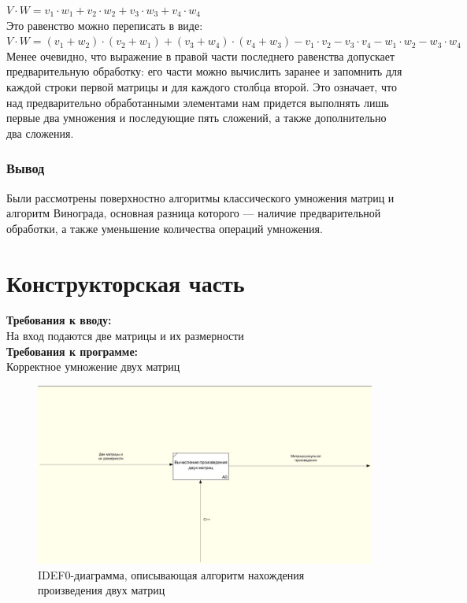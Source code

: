 \documentclass[12pt]{report}
\begin{document}
$ V \cdot W=v_1 \cdot w_1 + v_2 \cdot w_2 + v_3 \cdot w_3 + v_4 \cdot w_4$ \\

Это равенство можно переписать в виде: \\
$V \cdot W=(v_1 + w_2) \cdot (v_2 + w_1) + (v_3 + w_4) \cdot (v_4 + w_3) - v_1 \cdot v_2 - v_3 \cdot v_4 - w_1 \cdot w_2 - w_3 \cdot w_4$\\

Менее очевидно, что выражение в правой части последнего равенства допускает предварительную обработку: его части можно вычислить заранее и запомнить для каждой строки первой матрицы и для каждого столбца второй. 
Это означает, что над предварительно обработанными элементами нам придется выполнять лишь первые два умножения и последующие пять сложений, а также дополнительно два сложения. 

\subsection{Вывод}
Были рассмотрены поверхностно алгоритмы классического умножения матриц и алгоритм Винограда, основная разница которого — наличие предварительной обработки, а также уменьшение количества операций умножения.


\chapter{Конструкторская часть}
\textbf{Требования к вводу:}\\
На вход подаются две матрицы и их размерности\\
\textbf{Требования к программе:}\\
Корректное умножение двух матриц \\

\begin{figure}[h]
\centering
\includegraphics[width=1\linewidth]{idef.jpg}
\caption{IDEF0-диаграмма, описывающая алгоритм нахождения произведения двух матриц}
\label{fig:mpr}
\end{figure}
\end{document}
